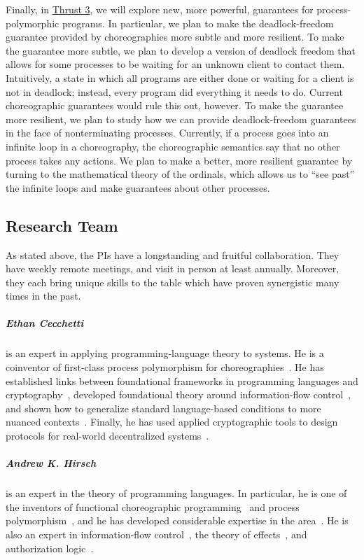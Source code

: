Finally, in \hyperref[sec:t3]{Thrust 3}, we will explore new, more powerful, guarantees for process-polymorphic programs.
In particular, we plan to make the deadlock-freedom guarantee provided by choreographies more subtle and more resilient.
To make the guarantee more subtle, we plan to develop a version of deadlock freedom that allows for some processes to be waiting for an unknown client to contact them.
Intuitively, a state in which all programs are either done or waiting for a client is not in deadlock; instead, every program did everything it needs to do.
Current choreographic guarantees would rule this out, however.
To make the guarantee more resilient, we plan to study how we can provide deadlock-freedom guarantees in the face of nonterminating processes.
Currently, if a process goes into an infinite loop in a choreography, the choreographic semantics say that no other process takes any actions.
We plan to make a better, more resilient guarantee by turning to the mathematical theory of the ordinals, which allows us to ``see past'' the infinite loops and make guarantees about other processes.

\subsection{Research Team}

As stated above, the PIs have a longstanding and fruitful collaboration.
They have weekly remote meetings, and visit in person at least annually.
Moreover, they each bring unique skills to the table which have proven synergistic many times in the past.

\subparagraph{Ethan Cecchetti} is an expert in applying programming-language theory to systems.
He is a coinventor of first-class process polymorphism for choreographies~\citep{SamuelsonHC25}.
He has established links between foundational frameworks in programming languages and cryptography~\citep{KuennemannPC24,PatrignaniKWC24},
developed foundational theory around information-flow control~\citep{HirschACAT20,HirschC21,SilverHCHZ23},
and shown how to generalize standard language-based conditions to more nuanced contexts~\citep{CecchettiMA17,CecchettiYNM21,Cecchetti25}.
Finally, he has used applied cryptographic tools to design protocols for real-world decentralized systems~\citep{ZhangCCJS16,CecchettiZJKJS17,CrooksBCHAA18,CecchettiFMJ19}.

\subparagraph{Andrew K. Hirsch} is an expert in the theory of programming languages.
In particular, he is one of the inventors of functional choreographic programming~\cite{HirschG22} and process polymorphism~\cite{GraversenHM24}, and he has developed considerable expertise in the area~\cite{SamuelsonHC25,GraversenHM24,HirschG22,BohosianH25}.
He is also an expert in information-flow control~\cite{SilverHCHZ23,MenzHLG23,HirschC21,HirschACAT20}, the theory of effects~\cite{SilverHCHZ23,HirschC21,HirschT18}, and authorization logic~\cite{HirschACAT20,HirschC13}.

